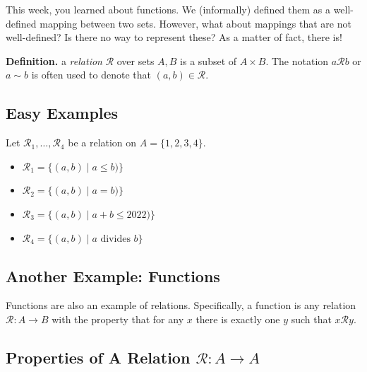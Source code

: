 \documentclass{article}
\begin{document}
    This week, you learned about functions. We (informally) defined them as a well-defined mapping between two sets. However, what about mappings that are not well-defined? Is there no way to represent these? As a matter of fact, there is!
    
    \vspace{3mm}
    \textbf{Definition.} a \textit{relation} $\mathcal{R}$ over sets $A, B$ is a subset of $A \times B$. The notation $a\mathcal{R}b$ or $a \sim b$ is often used to denote that $(a, b) \in \mathcal{R}$.

    \subsection*{Easy Examples}
    
    Let $\mathcal{R}_1, \dots, \mathcal{R}_4$ be a relation on $A = \{1, 2, 3, 4\}$.
    \begin{itemize}
        \item $\mathcal{R}_1 = \{(a, b) \mid a \le b)\}$
        \item $\mathcal{R}_2 = \{(a, b) \mid a = b)\}$
        \item $\mathcal{R}_3 = \{(a, b) \mid a+b \le 2022)\}$
        \item $\mathcal{R}_4 = \{(a, b) \mid a \text{ divides } b\}$
    \end{itemize}

    \subsection*{Another Example: Functions}
    Functions are also an example of relations. Specifically, a function is any relation $\mathcal{R}: A \rightarrow B$ with the property that for any $x$ there is exactly one $y$ such that $x\mathcal{R}y$.
    
    
\subsection*{Properties of A Relation $\mathcal{R} \colon A \rightarrow A$}
\end{document}
